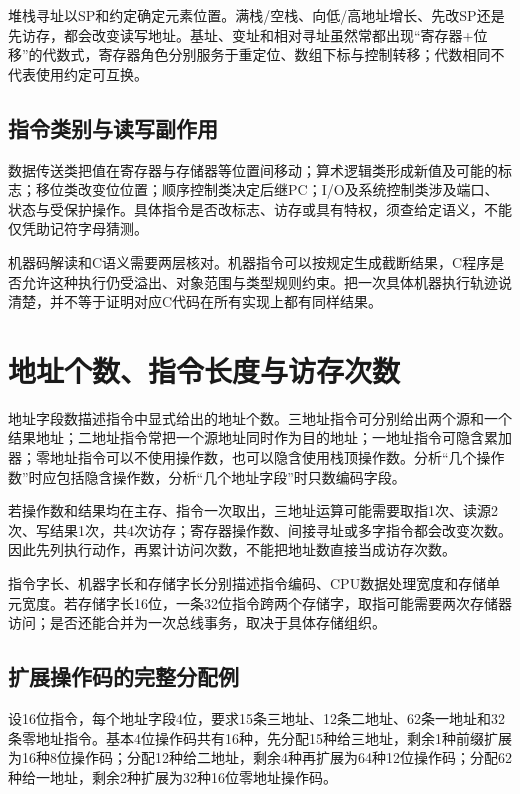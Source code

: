 堆栈寻址以SP和约定确定元素位置。满栈/空栈、向低/高地址增长、先改SP还是先访存，都会改变读写地址。基址、变址和相对寻址虽然常都出现``寄存器+位移''的代数式，寄存器角色分别服务于重定位、数组下标与控制转移；代数相同不代表使用约定可互换。

\subsection{指令类别与读写副作用}\label{CO04-effects}

数据传送类把值在寄存器与存储器等位置间移动；算术逻辑类形成新值及可能的标志；移位类改变位位置；顺序控制类决定后继PC；I/O及系统控制类涉及端口、状态与受保护操作。具体指令是否改标志、访存或具有特权，须查给定语义，不能仅凭助记符字母猜测。

机器码解读和C语义需要两层核对。机器指令可以按规定生成截断结果，C程序是否允许这种执行仍受溢出、对象范围与类型规则约束。把一次具体机器执行轨迹说清楚，并不等于证明对应C代码在所有实现上都有同样结果。

\section{地址个数、指令长度与访存次数}\label{CO04-formats-complete}

地址字段数描述指令中显式给出的地址个数。三地址指令可分别给出两个源和一个结果地址；二地址指令常把一个源地址同时作为目的地址；一地址指令可隐含累加器；零地址指令可以不使用操作数，也可以隐含使用栈顶操作数。分析``几个操作数''时应包括隐含操作数，分析``几个地址字段''时只数编码字段。

若操作数和结果均在主存、指令一次取出，三地址运算可能需要取指1次、读源2次、写结果1次，共4次访存；寄存器操作数、间接寻址或多字指令都会改变次数。因此先列执行动作，再累计访问次数，不能把地址数直接当成访存次数。

指令字长、机器字长和存储字长分别描述指令编码、CPU数据处理宽度和存储单元宽度。若存储字长16位，一条32位指令跨两个存储字，取指可能需要两次存储器访问；是否还能合并为一次总线事务，取决于具体存储组织。

\subsection{扩展操作码的完整分配例}\label{CO04-opcode-complete}

设16位指令，每个地址字段4位，要求15条三地址、12条二地址、62条一地址和32条零地址指令。基本4位操作码共有16种，先分配15种给三地址，剩余1种前缀扩展为16种8位操作码；分配12种给二地址，剩余4种再扩展为64种12位操作码；分配62种给一地址，剩余2种扩展为32种16位零地址操作码。

